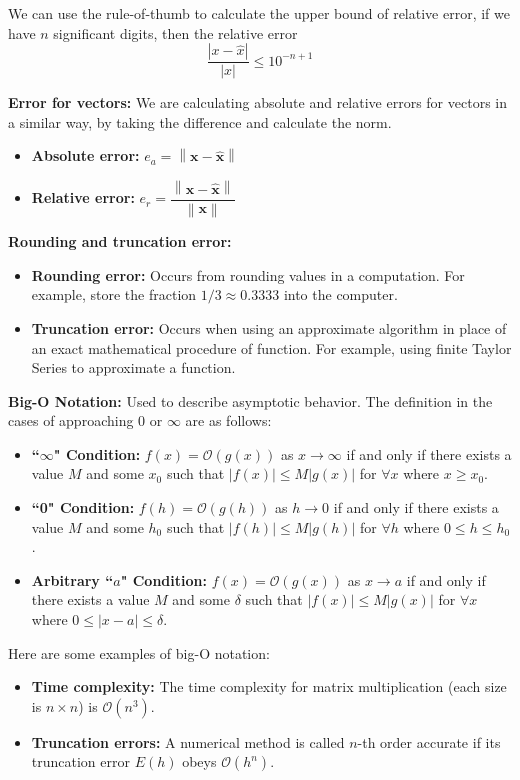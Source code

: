 \documentclass[12pt]{article}
\newcommand\norm[1]{\left\lVert#1\right\rVert}
\begin{document}
    We can use the rule-of-thumb to calculate the upper bound of relative error, if we have $n$ significant digits, then the relative error
        $$\frac{|x - \hat{x}|}{|x|} \leq 10^{-n+1}$$

\medskip
\noindent \textbf{Error for vectors:} We are calculating absolute and relative errors for vectors in a similar way, by taking the difference and calculate the norm. 
    \begin{itemize}
        \item \textbf{Absolute error:} $e_a = \norm{\mathbf{x} - \mathbf{\hat{x}}}$
        \item \textbf{Relative error:} $e_r = \dfrac{\norm{\mathbf{x} - \mathbf{\hat{x}}}}{\norm{\mathbf{x}}}$
    \end{itemize}

\newpage
\noindent \textbf{Rounding and truncation error:} 
    \begin{itemize}
        \item \textbf{Rounding error: }Occurs from rounding values in a computation. For example, store the fraction $1/3 \approx 0.3333$ into the computer. 
        \item \textbf{Truncation error: }Occurs when using an approximate algorithm in place of an exact mathematical procedure of function. For example, using finite Taylor Series to approximate a function.
    \end{itemize}

\medskip
\noindent \textbf{Big-O Notation:} Used to describe asymptotic behavior. The definition in the cases of approaching 0 or $\infty$ are as follows:
    \begin{itemize}
        \item \textbf{``$\infty$" Condition:} $f(x) = \mathcal{O}(g(x))$ as $x \to \infty$ if and only if there exists a value $M$ and some $x_0$ such that $|f(x)| \leq M|g(x)|$ for $\forall x$ where $x \geq x_0$.
        \item \textbf{``0" Condition:} $f(h) = \mathcal{O}(g(h))$ as $h \to 0$ if and only if there exists a value $M$ and some $h_0$ such that $|f(h)| \leq M|g(h)|$ for $\forall h$ where $0 \leq h \leq h_0$.
        \item \textbf{Arbitrary ``$a$" Condition:} $f(x) = \mathcal{O}(g(x))$ as $x \to a$ if and only if there exists a value $M$ and some $\delta$ such that $|f(x)| \leq M|g(x)|$ for $\forall x$ where $0 \leq |x-a| \leq \delta$.
    \end{itemize}
    Here are some examples of big-O notation:
        \begin{itemize}
            \item \textbf{Time complexity:} The time complexity for matrix multiplication (each size is $n \times n$) is $\mathcal{O}(n^3)$.
            \item \textbf{Truncation errors:} A numerical method is called $n$-th order accurate if its truncation error $E(h)$ obeys $\mathcal{O}(h^n)$.
        \end{itemize}
\end{document}
